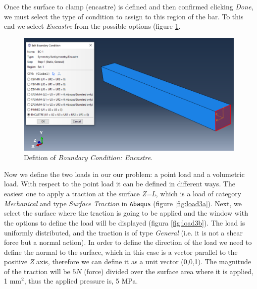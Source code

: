 \documentclass[spanish,a4paper,12pt]{article}
\begin{document}
Once the surface to clamp (encastre) is defined and then confirmed clicking \emph{Done}, we must select the type of condition to assign to this region of the bar. To this end we select \emph{Encastre} from the possible options (figure \ref{fig:load2}.

\begin{figure}[h!tp]
\centering
\includegraphics[scale=0.4]{capturas/load3.png}
\caption{Defition of \emph{Boundary Condition: Encastre}.}
\label{fig:load2}
\end{figure}

Now we define the two loads in our our problem: a point load and a volumetric load. With respect to the point load it can be defined in different ways. The easiest one to apply a traction at the surface \emph{Z=L}, which is a load of category \emph{Mechanical} and type \emph{Surface Traction} in \texttt{Abaqus} (figure \ref{fig:load3a}). Next, we select the surface where the traction is going to be applied and the window with the options to define the load will be displayed (figura \ref{fig:load3b}). The load is uniformly distributed, and the traction is of type  \emph{General} (i.e. it is not a shear force but a normal action). In order to define the direction of the load we need to define the normal to the surface, which in this case is a vector parallel to the positive  \emph{Z} axis, therefore we can define it as a unit vector (0,0,1). The magnitude of the traction will be $5 N$ (force) divided over the surface area where it is applied, 1 mm$^2$, thus the applied pressure is, 5 MPa.
\end{document}
